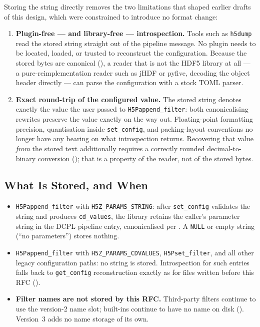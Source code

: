 \documentclass[../RFC-HDFG-2026-001.tex]{subfiles}
\begin{document}
Storing the string directly removes the two limitations that shaped
earlier drafts of this design, which were constrained to introduce no
format change:

\begin{enumerate}
\item \textbf{Plugin-free --- and library-free --- introspection.}  Tools
  such as \texttt{h5dump} read the stored string straight out of the
  pipeline message.  No plugin needs to be located, loaded, or trusted to
  reconstruct the configuration.  Because the stored bytes are canonical
  (), a reader that is not the HDF5
  library at all --- a pure-reimplementation reader such as jHDF or pyfive,
  decoding the object header directly --- can parse the configuration with
  a stock TOML parser.
\item \textbf{Exact round-trip of the configured value.}  The stored string
  denotes exactly the value the user passed to
  \texttt{H5Pappend\_filter}: both canonicalising rewrites preserve the
  value exactly on the way out.  Floating-point formatting precision,
  quantisation inside \texttt{set\_config}, and packing-layout conventions
  no longer have any bearing on what introspection returns.  Recovering
  that value \emph{from} the stored text additionally requires a correctly
  rounded decimal-to-binary conversion
  (); that is a property of the reader,
  not of the stored bytes.
\end{enumerate}

\subsection{What Is Stored, and When}
\label{sec:config-storage-rules}

\begin{itemize}
\item \texttt{H5Pappend\_filter} with \texttt{H5Z\_PARAMS\_STRING}: after
  \texttt{set\_config} validates the string and produces
  \texttt{cd\_values}, the library retains the caller's parameter string in
  the DCPL pipeline entry, canonicalised per
  .  A \texttt{NULL} or empty string
  (``no parameters'') stores nothing.
\item \texttt{H5Pappend\_filter} with \texttt{H5Z\_PARAMS\_CDVALUES},
  \texttt{H5Pset\_filter}, and all other legacy configuration paths: no
  string is stored.  Introspection for such entries falls back to
  \texttt{get\_config} reconstruction exactly as for files written before
  this RFC ().
\item \textbf{Filter names are not stored by this RFC.}  Third-party
  filters continue to use the version-2 name slot; built-ins continue to
  have no name on disk ().  Version~3 adds
  no name storage of its own.
\end{itemize}
\end{document}

